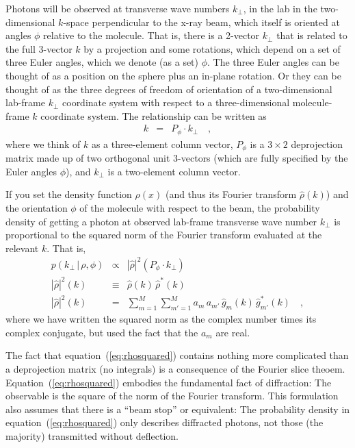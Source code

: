 \documentclass[12pt]{article}
\newcommand{\given}{\,|\,}
\begin{document}
Photons will be observed at transverse wave numbers $k_\perp$, in the
lab in the two-dimensional $k$-space perpendicular to the x-ray beam,
which itself is oriented at angles $\phi$ relative to the molecule.
That is, there is a 2-vector $k_\perp$ that is related to the full
3-vector $k$ by a projection and some rotations, which depend on a set
of three Euler angles, which we denote (as a set) $\phi$.
The three Euler angles can be thought of as a position on the sphere
plus an in-plane rotation.
Or they can be thought of as the three degrees of freedom of
orientation of a two-dimensional lab-frame $k_\perp$ coordinate system
with respect to a three-dimensional molecule-frame $k$ coordinate
system.
The relationship can be written as
\begin{eqnarray}
  k &=& P_\phi \cdot k_\perp
  \quad ,
\end{eqnarray}
where we think of $k$ as a three-element column vector, $P_\phi$ is a
$3\times 2$ deprojection matrix made up of two orthogonal unit
3-vectors (which are fully specified by the Euler angles $\phi$), and
$k_\perp$ is a two-element column vector.

If you set the density function $\rho(x)$ (and thus its Fourier
transform $\hat{\rho}(k)$) and the orientation $\phi$ of the molecule
with respect to the beam, the probability density of getting a photon
at observed lab-frame transverse wave number $k_\perp$ is proportional
to the squared norm of the Fourier transform evaluated at the relevant
$k$.  That is,
\begin{eqnarray}
  p(k_\perp\given\rho,\phi) &\propto& |\hat{\rho}|^2(P_\phi \cdot k_\perp)
  \label{eq:rhosquared} \\
  |\hat{\rho}|^2(k) &\equiv& \hat{\rho}(k)\,\hat{\rho}^{\ast}(k)
  \\
  |\hat{\rho}|^2(k) &=& \sum_{m=1}^M\sum_{m'=1}^M a_m\,a_{m'}\,\hat{g}_m(k)\,\hat{g}_{m'}^{\ast}(k)
  \label{eq:rhosquaredexpansion} \quad ,
\end{eqnarray}
where we have written the squared norm as the complex number times its
complex conjugate, but used the fact that the $a_m$ are real.

The fact that equation~(\ref{eq:rhosquared}) contains nothing more
complicated than a deprojection matrix (no integrals) is a consequence
of the Fourier slice theoem.
Equation~(\ref{eq:rhosquared}) embodies the fundamental fact of
diffraction: The observable is the square of the norm of the Fourier
transform.
This formulation also assumes that there is a ``beam stop'' or
equivalent: The probability density in equation~(\ref{eq:rhosquared})
only describes diffracted photons, not those (the majority)
transmitted without deflection.
\end{document}
